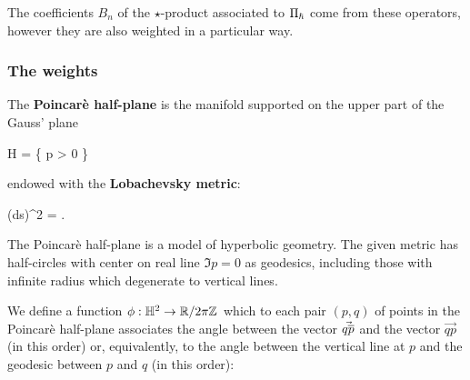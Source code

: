 The coefficients $B_n$ of the $\star$-product associated to $\Pi_{\boldsymbol\hslash}$ come from these operators, however they are also weighted in a particular way.

\subsubsection{The weights}
\begin{definition}
	The \textbf{Poincarè half-plane} is the manifold supported on the upper part of the Gauss' plane
	\begin{eqalign}
		\mathbb H = \{ p \in \C \suchthat {} > 0 \}
	\end{eqalign}
	endowed with the \textbf{Lobachevsky metric}:
	\begin{eqalign}
		(ds)^2 = \frac{(dx)^2 + (dy)^2}{y^2}.
	\end{eqalign}
\end{definition}

The Poincarè half-plane is a model of hyperbolic geometry. The given metric has half-circles with center on real line $\Im{p} = 0$ as geodesics, including those with infinite radius which degenerate to vertical lines.

\begin{figure}[H]
	\centering
\end{figure}

We define a function $\phi : \mathbb H^2 \to \mathbb{R} / 2\pi\mathbb{Z}$ which to each pair $(p,q)$ of points in the Poincarè half-plane associates the angle between the vector $\vec{q\overline{p}}$ and the vector $\vec{q p}$ (in this order) or, equivalently, to the angle between the vertical line at $p$ and the geodesic between $p$ and $q$ (in this order):

\begin{figure}[H]
	\centering
\end{figure}

